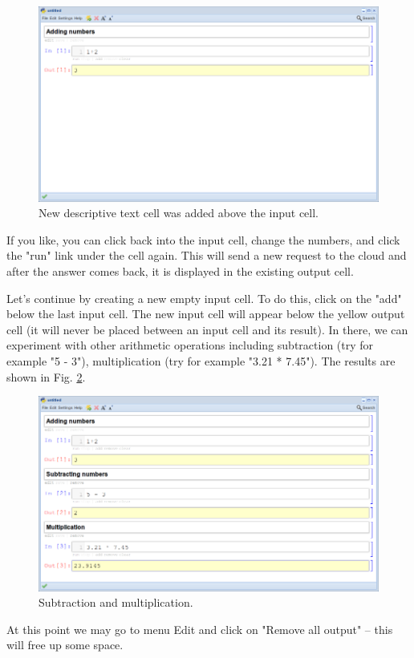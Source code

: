 \documentclass{article}
\begin{document}
\begin{figure}[!ht]
\begin{center}
\includegraphics[width=\textwidth]{img/1p3r.png}
\end{center}
\caption{New descriptive text cell was added above the input cell.}
\label{fig:1p3r}
\end{figure}
\noindent
\noindent
If you like, you can click back into the input cell, change 
the numbers, and click the "run" link under the cell again. 
This will send a new request to the cloud and after the answer 
comes back, it is displayed in the existing output 
cell. 

Let's continue by creating a new empty input cell. To do this, click 
on the "add" below the last input cell. The new input cell will appear below the yellow 
output cell (it will never be placed between an input cell and its 
result). In there, we can experiment with other arithmetic operations 
including subtraction (try for example "5 - 3"), multiplication 
(try for example "3.21 * 7.45"). The results are shown in Fig. \ref{fig:1p3r2}.

\newpage

\begin{figure}[!ht]
\begin{center}
\includegraphics[width=\textwidth]{img/1p3r2.png}
\end{center}
\caption{Subtraction and multiplication.}
\label{fig:1p3r2}
\end{figure}
\noindent
At this point we may go to menu Edit and click on 
"Remove all output" -- this will free up some space.\\
\end{document}
